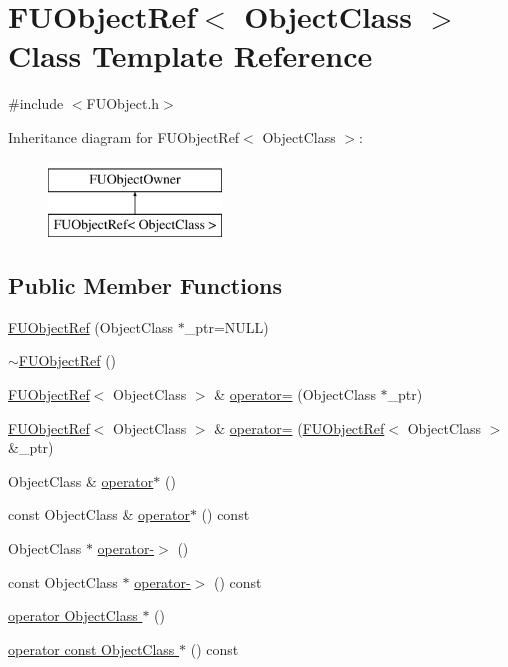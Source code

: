 \hypertarget{classFUObjectRef}{
\section{FUObjectRef$<$ ObjectClass $>$ Class Template Reference}
\label{classFUObjectRef}
}


{\ttfamily \#include $<$FUObject.h$>$}

Inheritance diagram for FUObjectRef$<$ ObjectClass $>$:\begin{figure}[H]
\begin{center}
\leavevmode
\includegraphics[height=2.000000cm]{classFUObjectRef}
\end{center}
\end{figure}
\subsection*{Public Member Functions}
\begin{DoxyCompactItemize}
\item 
\hyperlink{classFUObjectRef_a5239fbae94243f11f13a9c067e551a43}{FUObjectRef} (ObjectClass $\ast$\_\-ptr=NULL)
\item 
\hyperlink{classFUObjectRef_acf955c786e7bae69b3d8a81ec00113be}{$\sim$FUObjectRef} ()
\item 
\hyperlink{classFUObjectRef}{FUObjectRef}$<$ ObjectClass $>$ \& \hyperlink{classFUObjectRef_a0c60f7c10d57c892ebcbbfaafc4c2e7c}{operator=} (ObjectClass $\ast$\_\-ptr)
\item 
\hyperlink{classFUObjectRef}{FUObjectRef}$<$ ObjectClass $>$ \& \hyperlink{classFUObjectRef_a9ce3c9a6881f76575981fdf7682cce4e}{operator=} (\hyperlink{classFUObjectRef}{FUObjectRef}$<$ ObjectClass $>$ \&\_\-ptr)
\item 
ObjectClass \& \hyperlink{classFUObjectRef_a73e5688dbca5e3c72d4683f15c84694a}{operator$\ast$} ()
\item 
const ObjectClass \& \hyperlink{classFUObjectRef_a092088a650f9fc6ef9d44c5e051a8046}{operator$\ast$} () const 
\item 
ObjectClass $\ast$ \hyperlink{classFUObjectRef_ad1a013555b54f2383774bed42eceee0c}{operator-\/$>$} ()
\item 
const ObjectClass $\ast$ \hyperlink{classFUObjectRef_ad228120371cfbc4bd1b1041b28c4e7c0}{operator-\/$>$} () const 
\item 
\hyperlink{classFUObjectRef_a9e79c1022ae398e3050c93e95f65a859}{operator ObjectClass $\ast$} ()
\item 
\hyperlink{classFUObjectRef_a096d4e19aac1ab750d29a19cc0cdbb75}{operator const ObjectClass $\ast$} () const 
\end{DoxyCompactItemize}
